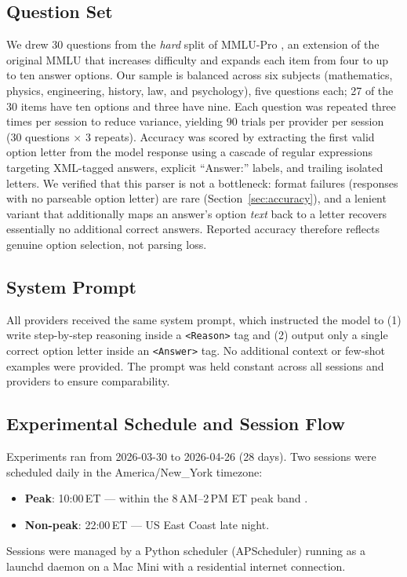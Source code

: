 \documentclass[11pt]{article}
\begin{document}
\subsection{Question Set}

We drew 30 questions from the \emph{hard} split of MMLU-Pro
\citep{wang2024mmlupro}, an extension of the original MMLU \citep{hendrycks2021measuring}
that increases difficulty and expands each item from four to up to ten answer options.
Our sample is balanced across six subjects (mathematics, physics, engineering, history,
law, and psychology), five questions each; 27 of the 30 items have ten options and three
have nine.
Each question was repeated three times per session to reduce variance, yielding 90 trials
per provider per session (30 questions $\times$ 3 repeats).
Accuracy was scored by extracting the first valid option letter from the model response
using a cascade of regular expressions targeting XML-tagged answers, explicit
``Answer:'' labels, and trailing isolated letters.
We verified that this parser is not a bottleneck: format failures (responses with no
parseable option letter) are rare (Section~\ref{sec:accuracy}), and a lenient variant that
additionally maps an answer's option \emph{text} back to a letter recovers essentially no
additional correct answers. Reported accuracy therefore reflects genuine option selection,
not parsing loss.

\subsection{System Prompt}

All providers received the same system prompt, which instructed the model to (1) write
step-by-step reasoning inside a \texttt{<Reason>} tag and (2) output only a single correct
option letter inside an \texttt{<Answer>} tag.
No additional context or few-shot examples were provided.
The prompt was held constant across all sessions and providers to ensure comparability.

\subsection{Experimental Schedule and Session Flow}

Experiments ran from 2026-03-30 to 2026-04-26 (28 days).
Two sessions were scheduled daily in the America/New\_York timezone:
\begin{itemize}
    \item \textbf{Peak}: 10:00\,ET --- within the 8\,AM--2\,PM ET peak band \citep{anthropic2026promotion}.
    \item \textbf{Non-peak}: 22:00\,ET --- US East Coast late night.
\end{itemize}
Sessions were managed by a Python scheduler (APScheduler) running as a launchd daemon on
a Mac Mini with a residential internet connection.
\end{document}

